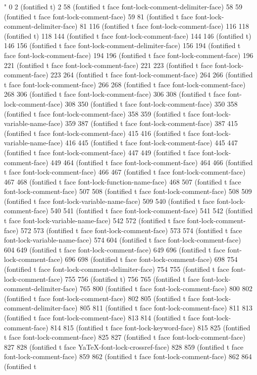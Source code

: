 {{%
%
" 0 2 (fontified t) 2 58 (fontified t face font-lock-comment-delimiter-face) 58 59 (fontified t face font-lock-comment-face) 59 81 (fontified t face font-lock-comment-delimiter-face) 81 116 (fontified t face font-lock-comment-face) 116 118 (fontified t) 118 144 (fontified t face font-lock-comment-face) 144 146 (fontified t) 146 156 (fontified t face font-lock-comment-delimiter-face) 156 194 (fontified t face font-lock-comment-face) 194 196 (fontified t face font-lock-comment-face) 196 221 (fontified t face font-lock-comment-face) 221 223 (fontified t face font-lock-comment-face) 223 264 (fontified t face font-lock-comment-face) 264 266 (fontified t face font-lock-comment-face) 266 268 (fontified t face font-lock-comment-face) 268 306 (fontified t face font-lock-comment-face) 306 308 (fontified t face font-lock-comment-face) 308 350 (fontified t face font-lock-comment-face) 350 358 (fontified t face font-lock-comment-face) 358 359 (fontified t face font-lock-variable-name-face) 359 387 (fontified t face font-lock-comment-face) 387 415 (fontified t face font-lock-comment-face) 415 416 (fontified t face font-lock-variable-name-face) 416 445 (fontified t face font-lock-comment-face) 445 447 (fontified t face font-lock-comment-face) 447 449 (fontified t face font-lock-comment-face) 449 464 (fontified t face font-lock-comment-face) 464 466 (fontified t face font-lock-comment-face) 466 467 (fontified t face font-lock-comment-face) 467 468 (fontified t face font-lock-function-name-face) 468 507 (fontified t face font-lock-comment-face) 507 508 (fontified t face font-lock-comment-face) 508 509 (fontified t face font-lock-variable-name-face) 509 540 (fontified t face font-lock-comment-face) 540 541 (fontified t face font-lock-comment-face) 541 542 (fontified t face font-lock-variable-name-face) 542 572 (fontified t face font-lock-comment-face) 572 573 (fontified t face font-lock-comment-face) 573 574 (fontified t face font-lock-variable-name-face) 574 604 (fontified t face font-lock-comment-face) 604 649 (fontified t face font-lock-comment-face) 649 696 (fontified t face font-lock-comment-face) 696 698 (fontified t face font-lock-comment-face) 698 754 (fontified t face font-lock-comment-delimiter-face) 754 755 (fontified t face font-lock-comment-face) 755 756 (fontified t) 756 765 (fontified t face font-lock-comment-delimiter-face) 765 800 (fontified t face font-lock-comment-face) 800 802 (fontified t face font-lock-comment-face) 802 805 (fontified t face font-lock-comment-delimiter-face) 805 811 (fontified t face font-lock-comment-face) 811 813 (fontified t face font-lock-comment-face) 813 814 (fontified t face font-lock-comment-face) 814 815 (fontified t face font-lock-keyword-face) 815 825 (fontified t face font-lock-comment-face) 825 827 (fontified t face font-lock-comment-face) 827 828 (fontified t face YaTeX-font-lock-crossref-face) 828 859 (fontified t face font-lock-comment-face) 859 862 (fontified t face font-lock-comment-face) 862 864 (fontified t }}
